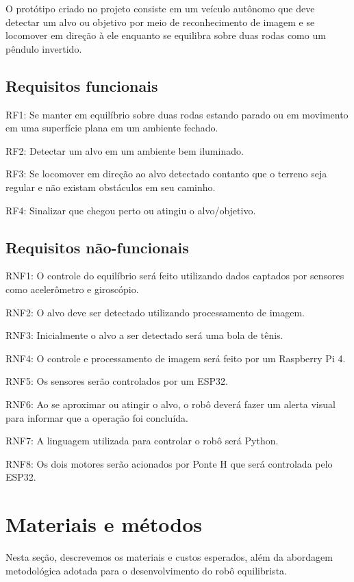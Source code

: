 O protótipo criado no projeto consiste em um veículo autônomo que deve detectar um alvo ou objetivo por meio de reconhecimento de imagem e se locomover em direção à ele enquanto se equilibra sobre duas rodas como um pêndulo invertido. 

\subsection{Requisitos funcionais}

RF1: Se manter em equilíbrio sobre duas rodas estando parado ou em movimento em uma superfície plana em um ambiente fechado.

RF2: Detectar um alvo em um ambiente bem iluminado.

RF3: Se locomover em direção ao alvo detectado contanto que o terreno seja regular e não existam obstáculos em seu caminho.

RF4: Sinalizar que chegou perto ou atingiu o alvo/objetivo.


\subsection{Requisitos não-funcionais}

RNF1: O controle do equilíbrio será feito utilizando dados captados por sensores como acelerômetro e giroscópio.

RNF2: O alvo deve ser detectado utilizando processamento de imagem.

RNF3: Inicialmente o alvo a ser detectado será uma bola de tênis.

RNF4: O controle e processamento de imagem será feito por um Raspberry Pi 4.

RNF5: Os sensores serão controlados por um ESP32.

RNF6: Ao se aproximar ou atingir o alvo, o robô deverá fazer um alerta visual para informar que a operação foi concluída.

RNF7: A linguagem utilizada para controlar o robô será Python.

RNF8: Os dois motores serão acionados por Ponte H que será controlada pelo ESP32.

\section{\textbf{Materiais e métodos}}
Nesta seção, descrevemos os materiais e custos esperados, além da abordagem metodológica adotada para o desenvolvimento do robô equilibrista.

